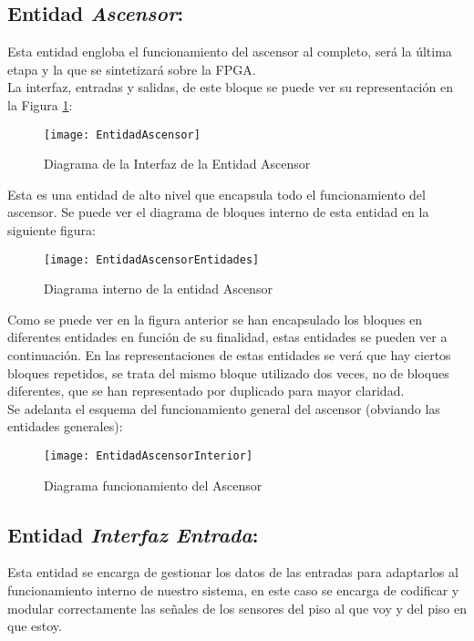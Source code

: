 ﻿\subsection{Entidad \textit{Ascensor}:} \label{bloque:Ascensor}
    Esta entidad engloba el funcionamiento del ascensor al completo, será la última etapa y la que se sintetizará sobre la FPGA.\\

    La interfaz, entradas y salidas, de este bloque se puede ver su representación en la Figura \ref{fig:EntidadIAscensor}:
    
    \begin{figure}[H]
		    \centering
		    \texttt{[image: EntidadAscensor]}
		    \caption{Diagrama de la Interfaz de la Entidad Ascensor}
		    \label{fig:EntidadIAscensor}
	\end{figure}
	
	Esta es una entidad de alto nivel que encapsula todo el funcionamiento del ascensor. Se puede ver el diagrama de bloques interno de esta entidad en la siguiente figura: 
	
	\begin{figure}[H]
		    \centering
		    \texttt{[image: EntidadAscensorEntidades]}
		    \caption{Diagrama interno de la entidad Ascensor}
		    \label{fig:EntidadIAscensorEntidades}
	\end{figure}
	
	Como se puede ver en la figura anterior se han encapsulado los bloques en diferentes entidades en función de su finalidad, estas entidades se pueden ver a continuación. En las representaciones de estas entidades se verá que hay ciertos bloques repetidos, se trata del mismo bloque utilizado dos veces, no de bloques diferentes, que se han representado por duplicado para mayor claridad. \\ 

	Se adelanta el esquema del funcionamiento general del ascensor (obviando las entidades generales):

	\begin{figure}[H]
		    \centering
		    \texttt{[image: EntidadAscensorInterior]}
		    \caption{Diagrama funcionamiento del Ascensor}
		    \label{fig:EntidadIAscensorInterior}
	\end{figure}

\subsection{Entidad \textit{Interfaz Entrada}:} \label{bloque:InterfazEntrada}
	Esta entidad se encarga de gestionar los datos de las entradas para adaptarlos al funcionamiento interno de nuestro sistema, en este caso se encarga de codificar y modular correctamente las señales de los sensores del piso al que voy y del piso en que estoy. \\ 

